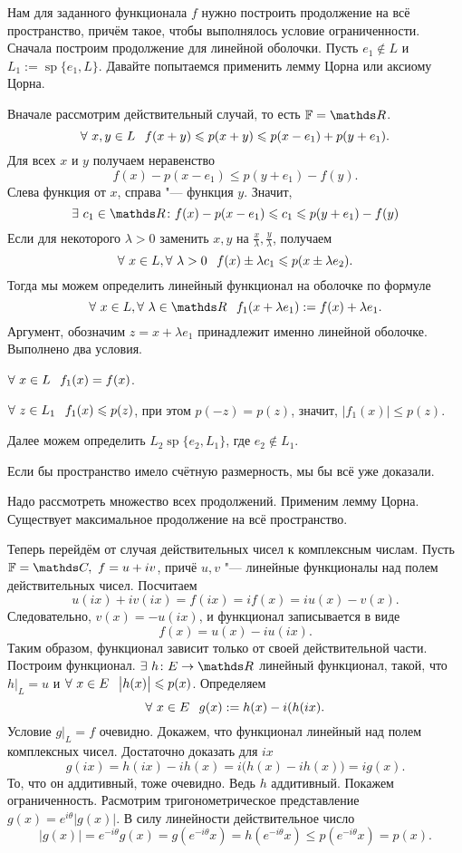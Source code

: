 \begin{Proof}
  Нам для заданного функционала $f$ нужно построить продолжение на всё пространство, причём такое, чтобы выполнялось условие ограниченности. Сначала построим продолжение для линейной оболочки. Пусть $e_1\not\in L$ и $L_1:=\mathop{sp}\{e_1,L\}$. Давайте попытаемся применить лемму Цорна или аксиому Цорна.

Вначале рассмотрим действительный случай, то есть $\F = \R$.
\[
  \forall\ x,y\in L\hskip .75em plus.1em minus.08em\relax f(x+y)\leqslant p(x+y)\leqslant p(x- e_1) + p(y+ e_1).
\]
Для всех $x$ и $y$ получаем неравенство
\[
  f(x) - p(x-e_1)\le p(y+e_1)-f(y).
\]
Слева функция от $x$, справа "--- функция $y$. Значит, 
\[
  \exists\ c_1\in \R\colon   f(x) - p(x-e_1)\le c_1\le p(y+e_1)-f(y)
\]
Если для некоторого  $\lambda>0$ заменить $x,y$ на $\frac x\lambda, \frac y\lambda$, получаем
\[
  \forall\ x\in L,\forall\ \lambda>0\pau f(x) \pm \lambda c_1\le p(x\pm \lambda e_2).
\]
Тогда мы можем определить линейный функционал на оболочке по формуле
\[
  \forall\ x\in L,\forall\ \lambda\in\R\pau f_1(x+\lambda e_1): = f(x) + \lambda e_1.
\]
Аргумент, обозначим $z = x+\lambda e_1$ принадлежит именно линейной оболочке. Выполнено два условия.
\begin{roItems}
  \item $\forall\ x\in L\pau f_1(x) = f(x)$.
  \item $\forall\ z\in L_1\pau f_1(x)\le p(z)$, при этом $p(-z) = p(z)$, значит, $\big|f_1(x)\big|\le p(z)$.
\end{roItems}
Далее можем определить $L_2\mathop{sp}\{e_2,L_1\}$, где $e_2\not\in L_1$.

Если бы пространство имело счётную размерность, мы бы всё уже доказали.

Надо рассмотреть множество всех продолжений. Применим лемму Цорна. Существует максимальное продолжение на всё пространство.

Теперь перейдём от случая действительных чисел к комплексным числам. Пусть $\F=\C,\ f = u+iv$, причё $u,v$ "--- линейные функционалы над полем действительных чисел. Посчитаем
\[
  u(ix) + i v(ix) = f(ix) = i f(x) = i u(x) - v(x).
\]
Следовательно, $v(x) = -u(ix) $, и функционал записывается в виде
\[
  f(x) = u(x) - i u(ix).
\]
Таким образом, функционал зависит только от своей действительной части. Построим функционал. $\exists\ h\colon E\to\R$ линейный функционал, такой, что $h\big|_{L} = u$ и $\forall\ x\in E\pau \big|h(x)\big|\le p(x)$. Определяем
\[
  \forall\ x\in E\pau g(x):= h(x) - i(h(ix).
\]
Условие $g\big|_{L}=f$ очевидно. Докажем, что функционал линейный над полем комплексных чисел. Достаточно доказать для $ix$
\[
  g(ix) = h(ix)  - i h(x) = i\big(h(x) - i h(x)\big) = i g(x).
\]
То, что он аддитивный, тоже очевидно. Ведь $h$ аддитивный. Покажем ограниченность. Расмотрим тригонометрическое представление $g(x) = e^{i\theta}\big|g(x)\big|$. В силу линейности действительное число
\[
  \big|g(x)\big| = e^{-i\theta} g(x) = g(e^{-i\theta}x) = h(e^{-i\theta}x)\le p(e^{-i\theta}x) = p(x).
\]
\end{Proof}

